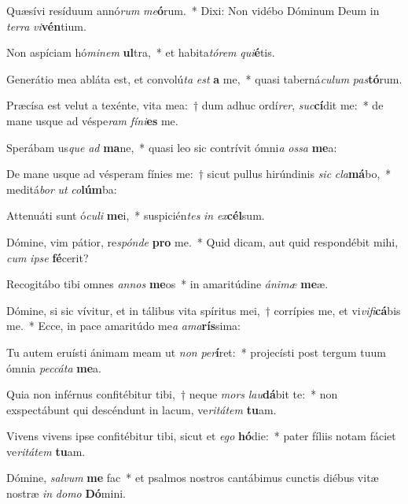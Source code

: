 \item Quæsívi resíduum annó\textit{rum} \textit{me}\textbf{ó}rum.~* Dixi: Non vidébo Dóminum Deum in \textit{ter}\textit{ra} \textit{vi}\textbf{vén}tium.
\item Non aspíciam hó\textit{mi}\textit{nem} \textbf{ul}tra,~* et habita\textit{tó}\textit{rem} \textit{qui}\textbf{é}tis.
\item Generátio mea abláta est, et convolú\textit{ta} \textit{est} \textbf{a} me,~* quasi taberná\textit{cu}\textit{lum} \textit{pas}\textbf{tó}rum.
\item Præcísa est velut a texénte, vita mea:~† dum adhuc ordí\textit{rer}, \textit{suc}\textbf{cí}dit me:~* de mane usque ad véspe\textit{ram} \textit{fí}\textit{ni}\textbf{es} me.
\item Sperábam us\textit{que} \textit{ad} \textbf{ma}ne,~* quasi leo sic contrívit ómni\textit{a} \textit{os}\textit{sa} \textbf{me}a:
\item De mane usque ad vésperam fínies me:~† sicut pullus hirúndinis \textit{sic} \textit{cla}\textbf{má}bo,~* meditá\textit{bor} \textit{ut} \textit{co}\textbf{lúm}ba:
\item Attenuáti sunt ó\textit{cu}\textit{li} \textbf{me}i,~* suspicién\textit{tes} \textit{in} \textit{ex}\textbf{cél}sum.
\item Dómine, vim pátior, re\textit{spón}\textit{de} \textbf{pro} me.~* Quid dicam, aut quid respondébit mihi, \textit{cum} \textit{ip}\textit{se} \textbf{fé}cerit?
\item Recogitábo tibi omnes \textit{an}\textit{nos} \textbf{me}os~* in amaritúdine \textit{á}\textit{ni}\textit{mæ} \textbf{me}æ.
\item Dómine, si sic vívitur, et in tálibus vita spíritus mei,~† corrípies me, et vi\textit{vi}\textit{fi}\textbf{cá}bis me.~* Ecce, in pace amaritúdo me\textit{a} \textit{a}\textit{ma}\textbf{rís}sima:
\item Tu autem eruísti ánimam meam ut \textit{non} \textit{per}\textbf{í}ret:~* projecísti post tergum tuum ómnia \textit{pec}\textit{cá}\textit{ta} \textbf{me}a.
\item Quia non inférnus confitébitur tibi,~† neque \textit{mors} \textit{lau}\textbf{dá}bit te:~* non exspectábunt qui descéndunt in lacum, ve\textit{ri}\textit{tá}\textit{tem} \textbf{tu}am.
\item Vivens vivens ipse confitébitur tibi, sicut et \textit{e}\textit{go} \textbf{hó}die:~* pater fíliis notam fáciet ve\textit{ri}\textit{tá}\textit{tem} \textbf{tu}am.
\item Dómine, \textit{sal}\textit{vum} \textbf{me} fac~* et psalmos nostros cantábimus cunctis diébus vitæ nostræ \textit{in} \textit{do}\textit{mo} \textbf{Dó}mini.
